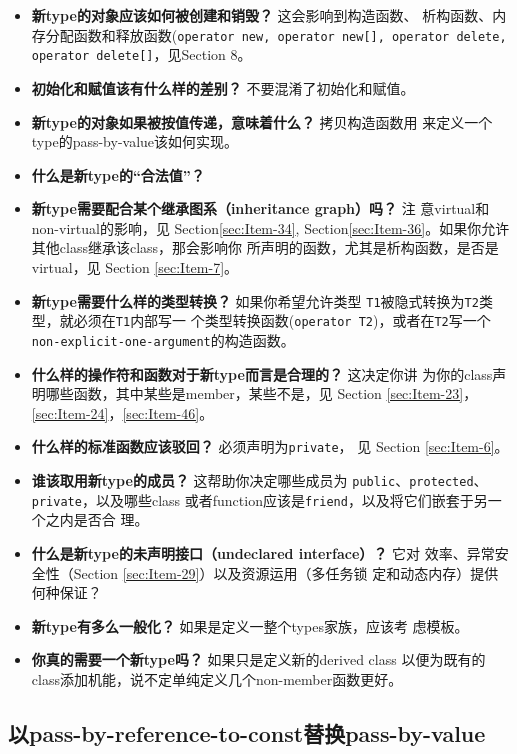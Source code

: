 \begin{itemize}
\item \textbf{新type的对象应该如何被创建和销毁？} 这会影响到构造函数、
  析构函数、内存分配函数和释放函数(\texttt{operator new, operator
    new[], operator delete, operator delete[]}，见Section 8。
\item \textbf{初始化和赋值该有什么样的差别？} 不要混淆了初始化和赋值。
\item \textbf{新type的对象如果被按值传递，意味着什么？} 拷贝构造函数用
  来定义一个type的pass-by-value该如何实现。
\item \textbf{什么是新type的“合法值”？}
\item\textbf{ 新type需要配合某个继承图系（inheritance graph）吗？} 注
  意virtual和non-virtual的影响，见 Section\ref{sec:Item-34},
  Section\ref{sec:Item-36}。如果你允许其他class继承该class，那会影响你
  所声明的函数，尤其是析构函数，是否是virtual，见 Section
  \ref{sec:Item-7}。
\item \textbf{新type需要什么样的类型转换？} 如果你希望允许类型
  \texttt{T1}被隐式转换为\texttt{T2}类型，就必须在\texttt{T1}内部写一
  个类型转换函数(\texttt{operator T2})，或者在\texttt{T2}写一个
  \texttt{non-explicit-one-argument}的构造函数。
\item \textbf{什么样的操作符和函数对于新type而言是合理的？} 这决定你讲
  为你的class声明哪些函数，其中某些是member，某些不是，见 Section
  \ref{sec:Item-23}，\ref{sec:Item-24}，\ref{sec:Item-46}。
\item \textbf{什么样的标准函数应该驳回？} 必须声明为\texttt{private}，
  见 Section \ref{sec:Item-6}。
\item \textbf{谁该取用新type的成员？} 这帮助你决定哪些成员为
  \texttt{public}、\texttt{protected}、\texttt{private}，以及哪些class
  或者function应该是\texttt{friend}，以及将它们嵌套于另一个之内是否合
  理。
\item \textbf{什么是新type的未声明接口（undeclared interface）？} 它对
  效率、异常安全性（Section \ref{sec:Item-29}）以及资源运用（多任务锁
  定和动态内存）提供何种保证？
\item \textbf{新type有多么一般化？} 如果是定义一整个types家族，应该考
  虑模板。
\item \textbf{你真的需要一个新type吗？} 如果只是定义新的derived class
  以便为既有的class添加机能，说不定单纯定义几个non-member函数更好。
\end{itemize}

\subsection{以pass-by-reference-to-const替换pass-by-value}
\label{sec:Item-20}

